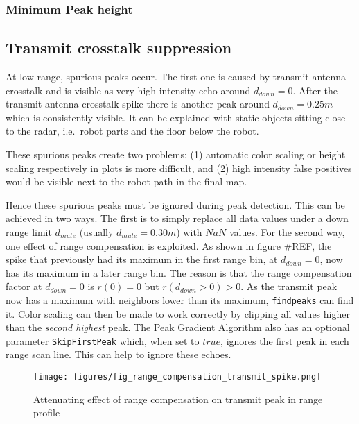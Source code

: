 \subsubsection{Minimum Peak height}\label{minimum-peak-height}

\subsection{Transmit crosstalk
suppression}\label{transmit-crosstalk-suppression}

At low range, spurious peaks occur. The first one is caused by transmit
antenna crosstalk and is visible as very high intensity echo around
\(d_{down}=0\). After the transmit antenna crosstalk spike there is
another peak around \(d_{down}=0.25m\) which is consistently visible. It
can be explained with static objects sitting close to the radar,
i.e.~robot parts and the floor below the robot.

These spurious peaks create two problems: (1) automatic color scaling or
height scaling respectively in plots is more difficult, and (2) high
intensity false positives would be visible next to the robot path in the
final map.

Hence these spurious peaks must be ignored during peak detection. This
can be achieved in two ways. The first is to simply replace all data
values under a down range limit \(d_{mute}\) (usually
\(d_{mute}=0.30m\)) with \(NaN\) values. For the second way, one effect
of range compensation is exploited. As shown in figure \#REF, the spike
that previously had its maximum in the first range bin, at
\(d_{down}=0\), now has its maximum in a later range bin. The reason is
that the range compensation factor at \(d_{down}=0\) is \(r(0) = 0\) but
\(r(d_{down}>0) > 0\). As the transmit peak now has a maximum with
neighbors lower than its maximum, \texttt{findpeaks} can find it. Color
scaling can then be made to work correctly by clipping all values higher
than the \emph{second highest} peak. The Peak Gradient Algorithm also
has an optional parameter \texttt{SkipFirstPeak} which, when set to
\(true\), ignores the first peak in each range scan line. This can help
to ignore these echoes.

\begin{figure}[htp]
    \centering
    \label{fig:fig_range_compensation_transmit_spike}
    \texttt{[image: figures/fig\_range\_compensation\_transmit\_spike.png]}
    \caption{Attenuating effect of range compensation on transmit peak in range profile}
\end{figure}

